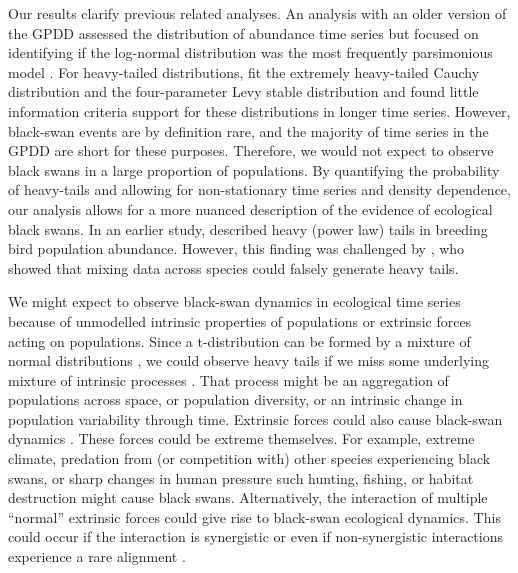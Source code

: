 Our results clarify previous related analyses. An analysis with an older
version of the GPDD assessed the distribution of abundance time series but
focused on identifying if the log-normal distribution was the most frequently
parsimonious model \citep{halley2002}. For heavy-tailed distributions,
\citet{halley2002} fit the extremely heavy-tailed Cauchy distribution and the
four-parameter Levy stable distribution and found little information criteria
support for these distributions in longer time series. However, black-swan
events are by definition rare, and the majority of time series in the GPDD are
short for these purposes. Therefore, we would not expect to observe black
swans in a large proportion of populations. By quantifying the probability of
heavy-tails and allowing for non-stationary time series and density
dependence, our analysis allows for a more nuanced description of the evidence
of ecological black swans. In an earlier study, \citet{keitt1998} described
heavy (power law) tails in breeding bird population abundance. However, this
finding was challenged by \citet{allen2001}, who showed that mixing data
across species could falsely generate heavy tails.

We might expect to observe black-swan dynamics in ecological time series
because of unmodelled intrinsic properties of populations or extrinsic forces
acting on populations. Since a t-distribution can be formed by a mixture of
normal distributions \citep[with the same mean and inverse-gamma-distributed
variances,][]{gelman2014}, we could observe heavy tails if we miss some
underlying mixture of intrinsic processes \citep{allen2001}. That process
might be an aggregation of populations across space, or population diversity,
or an intrinsic change in population variability through time. Extrinsic
forces could also cause black-swan dynamics \citep[e.g.][]{nunez2012}. These
forces could be extreme themselves. For example, extreme climate, predation
from (or competition with) other species experiencing black swans, or sharp
changes in human pressure such hunting, fishing, or habitat destruction might
cause black swans. Alternatively, the interaction of multiple ``normal''
extrinsic forces could give rise to black-swan ecological dynamics. This could
occur if the interaction is synergistic \citep[e.g.][]{kirby2009} or even if
non-synergistic interactions experience a rare alignment \citep{denny2009}.

